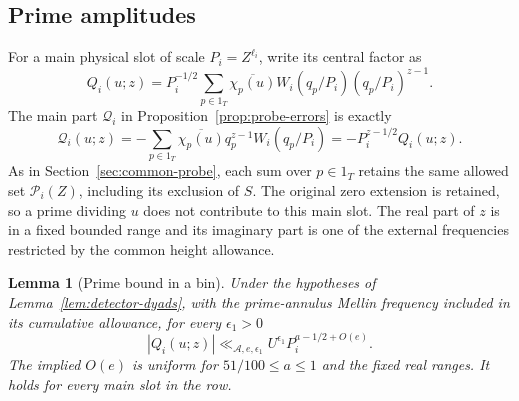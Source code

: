 \documentclass[12pt]{article}
\newtheorem{lemma}[theorem]{Lemma}
\begin{document}
\subsection{Prime amplitudes}\label{sec:amplitudes}

For a main physical slot of scale \(P_i=Z^{\ell_i}\), write its
central factor as
\[
 Q_i(u;z)=P_i^{-1/2}\sum_{p\in1_T}
   \overline{\chi_p(u)}W_i(q_p/P_i)(q_p/P_i)^{z-1}.
\]
The main part \(\mathcal Q_i\) in Proposition~\ref{prop:probe-errors} is exactly
\[
 \mathcal Q_i(u;z)=-\sum_{p\in1_T}\overline{\chi_p(u)}q_p^{z-1}W_i(q_p/P_i)
 =-P_i^{z-1/2}Q_i(u;z).
\]
As in Section~\ref{sec:common-probe}, each sum over \(p\in1_T\) retains
the same allowed set \(\mathcal P_i(Z)\), including its exclusion of \(S\).
The original zero extension is retained, so a prime dividing \(u\)
does not contribute to this main slot.  The real part of \(z\) is
in a fixed bounded range and its imaginary part is one of the
external frequencies restricted by the common height allowance.

\begin{lemma}[Prime bound in a bin]\label{lem:bin-prime-bound}
Under the hypotheses of Lemma~\ref{lem:detector-dyads}, with the
prime-annulus Mellin frequency included in its cumulative allowance,
for every \(\epsilon_1>0\)
\[
 |Q_i(u;z)|\ll_{\mathcal A,e,\epsilon_1}
 U^{\epsilon_1}P_i^{a-1/2+O(e)}.
\]
The implied \(O(e)\) is uniform for \(51/100\le a\le1\) and the
fixed real ranges.  It holds for every main slot in the row.
\end{lemma}
\end{document}

